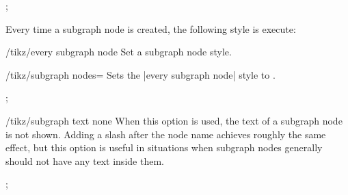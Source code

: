 \begin{codeexample}[] 
\tikz [subgraph text bottom=text centered,
       subgraph nodes={font=\itshape}]
  ;
\end{codeexample}  



Every time a subgraph node is created, the  following style is execute: 

\begin{key}{/tikz/every subgraph node}
  Set a subgraph node style.
\end{key}

\begin{key}{/tikz/subgraph nodes=}
  Sets the |every subgraph node| style to .
\begin{codeexample}[] 
\tikz [subgraph text bottom=text centered,
       subgraph nodes=red]
  ;
\end{codeexample}  
\end{key}

\begin{key}{/tikz/subgraph text none}
  When this option is used, the text of a subgraph node is not
  shown. Adding a slash after the node name achieves roughly the same
  effect, but this option is useful in situations when subgraph nodes
  generally should not have any text inside them.
\begin{codeexample}[] 
  ;
\end{codeexample}  

\end{key}

